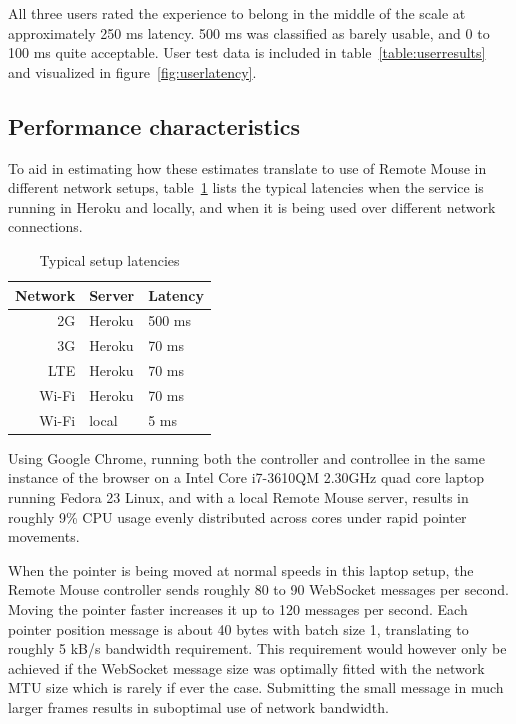 \documentclass[a4paper,english,twocolumn,9pt]{extarticle}
\begin{document}
All three users rated the experience to belong in the middle of the
scale at approximately 250 ms latency. 500 ms was classified as barely
usable, and 0 to 100 ms quite acceptable. User test data is included
in table~\ref{table:userresults} and visualized in
figure~\ref{fig:userlatency}.

\subsection*{Performance characteristics}

To aid in estimating how these estimates translate to use of Remote
Mouse in different network setups, table~\ref{table:setuplatencies}
lists the typical latencies when the service is running in Heroku and
locally, and when it is being used over different network
connections.

\begin{table} \centering
  \begin{tabular}{rll}
    Network & Server & Latency \\
    \hline
    2G & Heroku    & 500 ms \\
    3G & Heroku    & 70 ms \\
    LTE & Heroku   & 70 ms \\
    Wi-Fi & Heroku & 70 ms \\
    Wi-Fi & local  & 5 ms \\
    \hline
  \end{tabular}
  \caption{Typical setup latencies}
  \label{table:setuplatencies}
\end{table}

Using Google Chrome, running both the controller and controllee in the
same instance of the browser on a Intel Core i7-3610QM 2.30GHz quad
core laptop running Fedora 23 Linux, and with a local Remote Mouse
server, results in roughly 9\% CPU usage evenly distributed across
cores under rapid pointer movements.

When the pointer is being moved at normal speeds in this laptop
setup, the Remote Mouse controller sends roughly 80 to 90 WebSocket
messages per second. Moving the pointer faster increases it up to 120
messages per second. Each pointer position message is about 40 bytes
with batch size 1, translating to roughly 5 kB/s bandwidth
requirement. This requirement would however only be achieved if the
WebSocket message size was optimally fitted with the network MTU size
which is rarely if ever the case. Submitting the small message in much
larger frames results in suboptimal use of network bandwidth.
\end{document}
